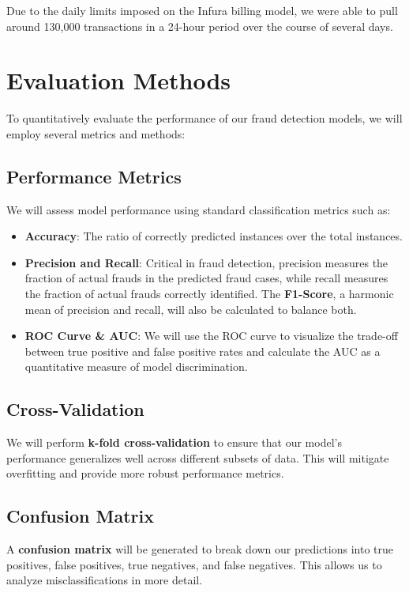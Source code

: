 \documentclass[sigconf]{acmart}
\begin{document}
Due to the daily limits imposed on the Infura billing model, we were able to pull around 130,000 transactions in a 24-hour period over the course of several days. 

\section{Evaluation Methods}

To quantitatively evaluate the performance of our fraud detection models, we will employ several metrics and methods:

\subsection{Performance Metrics}
We will assess model performance using standard classification metrics such as:
\begin{itemize}
    \item \textbf{Accuracy}: The ratio of correctly predicted instances over the total instances.
    \item \textbf{Precision and Recall}: Critical in fraud detection, precision measures the fraction of actual frauds in the predicted fraud cases, while recall measures the fraction of actual frauds correctly identified. The \textbf{F1-Score}, a harmonic mean of precision and recall, will also be calculated to balance both.
    \item \textbf{ROC Curve \& AUC}: We will use the ROC curve to visualize the trade-off between true positive and false positive rates and calculate the AUC as a quantitative measure of model discrimination.
\end{itemize}

\subsection{Cross-Validation}
We will perform \textbf{k-fold cross-validation} to ensure that our model's performance generalizes well across different subsets of data. This will mitigate overfitting and provide more robust performance metrics.

\subsection{Confusion Matrix}
A \textbf{confusion matrix} will be generated to break down our predictions into true positives, false positives, true negatives, and false negatives. This allows us to analyze misclassifications in more detail.
\end{document}
